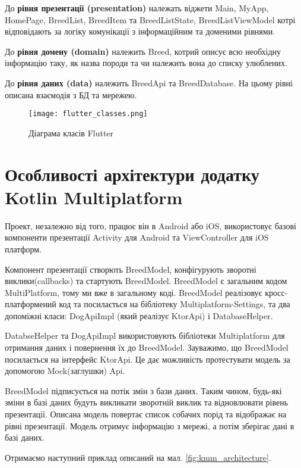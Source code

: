 До \textbf{рівня презентації (presentation)} належать віджети Main, MyApp, HomePage, BreedList, BreedItem та
BreedListState, BreedListViewModel котрі відповідають за логіку комунікації з інформаційним та доменими рівнями.

До \textbf{рівня домену (domain)} належить Breed, котрий описує всю необхідну інформацію таку, як назва породи та чи
належить вона до списку улюблених.

До \textbf{рівня даних (data)} належить BreedApi та BreedDatabase. На цьому рівні описана взаємодія з БД та мережею.

\begin{figure}
    \begin{center}
        \texttt{[image: flutter\_classes.png]}
        \caption{Діаграма класів Flutter}
        \label{fig:flutter_classes}
    \end{center}
\end{figure}


\section{Особливості архітектури додатку Kotlin Multiplatform}
\label{sec:kmm_architecture}

Проект, незалежно від того, працює він в Android або iOS, використовує базові компоненти презентації
Activity для Android та ViewController для iOS платформ.

Компонент презентації створють BreedModel, конфігурують зворотні виклики(callbacks) та стартують BreedModel.
BreedModel є загальним кодом MultiPlatform, тому ми вже в загальному коді.
BreedModel реалізовує кросс-платформений код та посилається на бібліотеку Multiplatform-Settings,
та два допоміжні класи: DogApiImpl (який реалізує KtorApi) і DatabaseHelper.

DatabseHelper та DogApiImpl використовують бібліотеки Multiplatform для отримання даних і повернення їх до BreedModel.
Зауважимо, що BreedModel посилається на інтерфейс KtorApi. Це дає можливість протестувати модель за допомогою Mock(заглушки) Api.

BreedModel підписується на потік змін з бази даних. Таким чином, будь-які зміни в базі даних будуть викликати
зворотній виклик та відновлювати рівень презентації.
Описана модель повертає список собачих порід та відображає на рівні презентації.
Модель отримує інформацію з мережі, а потім зберігає дані в базі даних.

Отримаємо наступний приклад описаний на мал. \ref{fig:kmm_architecture}.

